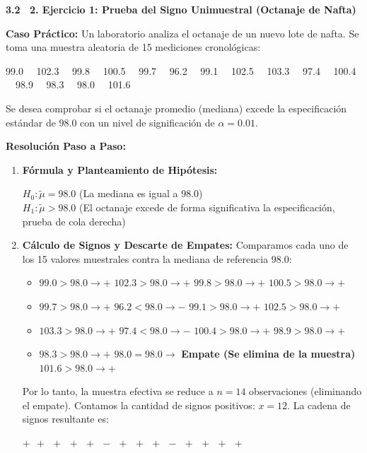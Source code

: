 \documentclass[10pt,a4paper]{article}
\begin{document}
\textbf{3.2 \ 2. Ejercicio 1: Prueba del Signo Unimuestral (Octanaje de Nafta)}

\textbf{Caso Práctico:} Un laboratorio analiza el octanaje de un nuevo lote de nafta. Se toma una muestra aleatoria de 15 mediciones cronológicas:

99.0 \ \ 102.3 \ \ 99.8 \ \ 100.5 \ \ 99.7 \ \ 96.2 \ \ 99.1 \ \ 102.5 \ \ 103.3 \ \ 97.4 \ \ 100.4 \ \ 98.9 \ \ 98.3 \ \ 98.0 \ \ 101.6

Se desea comprobar si el octanaje promedio (mediana) excede la especificación estándar de 98.0 con un nivel de significación de $\alpha = 0.01$.

\textbf{Resolución Paso a Paso:}
\begin{enumerate}[leftmargin=18pt,itemsep=2pt,topsep=2pt,parsep=0pt]
  \item \textbf{Fórmula y Planteamiento de Hipótesis:}

  $H_0 : \tilde{\mu} = 98.0$ \quad (La mediana es igual a 98.0)\\
  $H_1 : \tilde{\mu} > 98.0$ \quad (El octanaje excede de forma significativa la especificación, prueba de cola derecha)

  \item \textbf{Cálculo de Signos y Descarte de Empates:} Comparamos cada uno de los 15 valores muestrales contra la mediana de referencia 98.0:
  \begin{itemize}[leftmargin=12pt,itemsep=1pt,topsep=1pt,parsep=0pt]
    \item $99.0>98.0 \rightarrow +$ \quad $102.3>98.0 \rightarrow +$ \quad $99.8>98.0 \rightarrow +$ \quad $100.5>98.0 \rightarrow +$
    \item $99.7>98.0 \rightarrow +$ \quad $96.2<98.0 \rightarrow -$ \quad $99.1>98.0 \rightarrow +$ \quad $102.5>98.0 \rightarrow +$
    \item $103.3>98.0 \rightarrow +$ \quad $97.4<98.0 \rightarrow -$ \quad $100.4>98.0 \rightarrow +$ \quad $98.9>98.0 \rightarrow +$
    \item $98.3>98.0 \rightarrow +$ \quad $98.0=98.0 \rightarrow$ \textbf{Empate (Se elimina de la muestra)} \quad $101.6>98.0 \rightarrow +$
  \end{itemize}

  Por lo tanto, la muestra efectiva se reduce a $n = 14$ observaciones (eliminando el empate). Contamos la cantidad de signos positivos: $x = 12$. La cadena de signos resultante es:

  \centerline{$+\ \ +\ \ +\ \ +\ \ +\ \ -\ \ +\ \ +\ \ +\ \ -\ \ +\ \ +\ \ +\ \ +$}


\end{enumerate}
\end{document}
